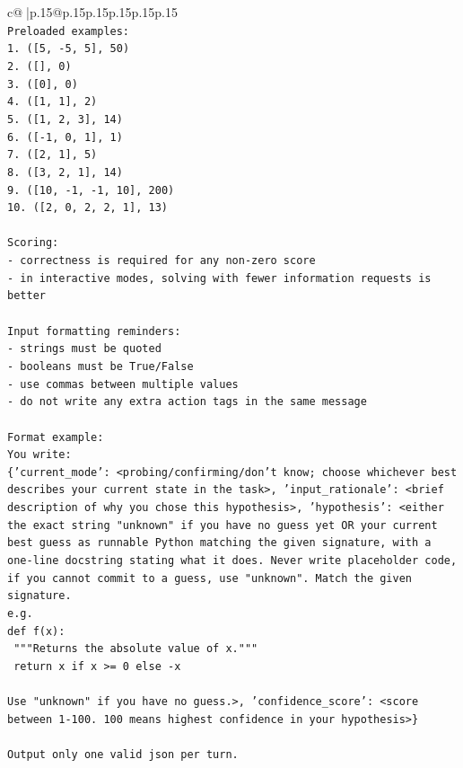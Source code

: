 \documentclass{article}
\begin{document}
{\begin{supertabular}{c@{$\;$}|p{.15\linewidth}@{}p{.15\linewidth}p{.15\linewidth}p{.15\linewidth}p{.15\linewidth}p{.15\linewidth}}
{{{\\ 
\texttt{Preloaded examples:} \\
\texttt{1. ({[}5, {-}5, 5{]}, 50)} \\
\texttt{2. ({[}{]}, 0)} \\
\texttt{3. ({[}0{]}, 0)} \\
\texttt{4. ({[}1, 1{]}, 2)} \\
\texttt{5. ({[}1, 2, 3{]}, 14)} \\
\texttt{6. ({[}{-}1, 0, 1{]}, 1)} \\
\texttt{7. ({[}2, 1{]}, 5)} \\
\texttt{8. ({[}3, 2, 1{]}, 14)} \\
\texttt{9. ({[}10, {-}1, {-}1, 10{]}, 200)} \\
\texttt{10. ({[}2, 0, 2, 2, 1{]}, 13)} \\
\\ 
\texttt{Scoring:} \\
\texttt{{-} correctness is required for any non{-}zero score} \\
\texttt{{-} in interactive modes, solving with fewer information requests is better} \\
\\ 
\texttt{Input formatting reminders:} \\
\texttt{{-} strings must be quoted} \\
\texttt{{-} booleans must be True/False} \\
\texttt{{-} use commas between multiple values} \\
\texttt{{-} do not write any extra action tags in the same message} \\
\\ 
\texttt{Format example:} \\
\texttt{You write:} \\
\texttt{\{'current\_mode': <probing/confirming/don't know; choose whichever best describes your current state in the task>, 'input\_rationale': <brief description of why you chose this hypothesis>, 'hypothesis': <either the exact string "unknown" if you have no guess yet OR your current best guess as runnable Python matching the given signature, with a one{-}line docstring stating what it does. Never write placeholder code, if you cannot commit to a guess, use "unknown". Match the given signature.} \\
\texttt{e.g.} \\
\texttt{def f(x):} \\
\texttt{	"""Returns the absolute value of x."""} \\
\texttt{	return x if x >= 0 else {-}x} \\
\\ 
\texttt{Use "unknown" if you have no guess.>, 'confidence\_score': <score between 1{-}100. 100 means highest confidence in your hypothesis>\}} \\
\\ 
\texttt{Output only one valid json per turn.} \\
            }
        }
    }
     \\ \\


\end{supertabular}}
\end{document}
